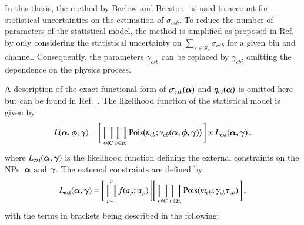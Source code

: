 \begin{itemize}
  In this thesis, the method by Barlow and Beeston~\cite{barlow1993} is used to
  account for statistical uncertainties on the estimation of $\sigma_{csb}$. To
  reduce the number of parameters of the statistical model, the method is
  simplified as proposed in Ref.~\cite{conway2011} by only considering the
  statistical uncertainty on $\sum_{s \in \mathcal{S}_{c}} \sigma_{csb}$ for a
  given bin and channel. Consequently, the parameters $\gamma_{csb}$ can be
  replaced by $\gamma_{cb}$, omitting the dependence on the physics process.

\end{itemize}
A description of the exact functional form of $\sigma_{csb}(\bm{\alpha})$ and
$\eta_{cs}(\bm{\alpha})$ is omitted here but can be found in
Ref.~\cite{cranmer2012}. The likelihood function of the statistical model is
given by
\begin{align}
  L(\bm{\alpha}, \bm{\phi}, \bm{\gamma}) = \Biggl[\,
  \prod_{c \in \mathcal{C}}
  \prod_{b \in \mathcal{B}_{c}}
  \operatorname{Pois}\bigl( n_{cb}; \nu_{cb}(\bm{\alpha}, \bm{\phi}, \bm{\gamma}) \bigr)
  \,\Biggr]
  \times L_{\text{ext}}(\bm{\alpha}, \bm{\gamma}) \,\text{,}
  \label{eq:likelihood_histfactory}
\end{align}
where $L_{\text{ext}}(\bm{\alpha}, \bm{\gamma})$ is the likelihood
function defining the external constraints on the NPs~$\bm{\alpha}$ and
$\bm{\gamma}$. The external constraints are defined by
\begin{align}
  L_{\text{ext}}(\bm{\alpha}, \bm{\gamma}) =
  \Biggl[\, \prod_{p=1}^{n} f(a_p; \alpha_p)     \,\Biggr]
  \Biggl[\, \prod_{c \in \mathcal{C}} \prod_{b \in \mathcal{B}_{c}} \operatorname{Pois}(m_{cb}; \gamma_{cb} \tau_{cb}) \,\Biggr] \,\text{,}
  \label{eq:likelihood_histfactory_constraints}
\end{align}
with the terms in brackets being described in the following:
